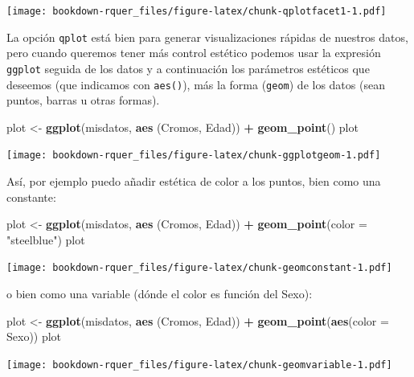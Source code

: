 \documentclass[]{book}
\newenvironment{Shaded}{\begin{snugshade}}{\end{snugshade}}
\newcommand{\DataTypeTok}[1]{\textcolor[rgb]{0.13,0.29,0.53}{#1}}
\newcommand{\KeywordTok}[1]{\textcolor[rgb]{0.13,0.29,0.53}{\textbf{#1}}}
\newcommand{\NormalTok}[1]{#1}
\newcommand{\OperatorTok}[1]{\textcolor[rgb]{0.81,0.36,0.00}{\textbf{#1}}}
\newcommand{\StringTok}[1]{\textcolor[rgb]{0.31,0.60,0.02}{#1}}
\theoremstyle{definition}
\theoremstyle{definition}
\theoremstyle{definition}
\theoremstyle{remark}
\begin{document}
\texttt{[image: bookdown-rquer\_files/figure-latex/chunk-qplotfacet1-1.pdf]}

La opción \texttt{qplot} está bien para generar visualizaciones rápidas
de nuestros datos, pero cuando queremos tener más control estético
podemos usar la expresión \texttt{ggplot} seguida de los datos y a
continuación los parámetros estéticos que deseemos (que indicamos con
\texttt{aes()}), más la forma (\texttt{geom}) de los datos (sean puntos,
barras u otras formas).

\begin{Shaded}
\begin{Highlighting}[]
\NormalTok{plot <-}\StringTok{ }\KeywordTok{ggplot}\NormalTok{(misdatos, }\KeywordTok{aes}\NormalTok{ (Cromos, Edad)) }\OperatorTok{+}\StringTok{ }\KeywordTok{geom_point}\NormalTok{()}
\NormalTok{plot}
\end{Highlighting}
\end{Shaded}

\texttt{[image: bookdown-rquer\_files/figure-latex/chunk-ggplotgeom-1.pdf]}

Así, por ejemplo puedo añadir estética de color a los puntos, bien como
una constante:

\begin{Shaded}
\begin{Highlighting}[]
\NormalTok{plot <-}\StringTok{ }\KeywordTok{ggplot}\NormalTok{(misdatos, }\KeywordTok{aes}\NormalTok{ (Cromos, Edad)) }\OperatorTok{+}\StringTok{ }\KeywordTok{geom_point}\NormalTok{(}\DataTypeTok{color =} \StringTok{"steelblue"}\NormalTok{)}
\NormalTok{plot}
\end{Highlighting}
\end{Shaded}

\texttt{[image: bookdown-rquer\_files/figure-latex/chunk-geomconstant-1.pdf]}

o bien como una variable (dónde el color es función del Sexo):

\begin{Shaded}
\begin{Highlighting}[]
\NormalTok{plot <-}\StringTok{ }\KeywordTok{ggplot}\NormalTok{(misdatos, }\KeywordTok{aes}\NormalTok{ (Cromos, Edad)) }\OperatorTok{+}\StringTok{ }\KeywordTok{geom_point}\NormalTok{(}\KeywordTok{aes}\NormalTok{(}\DataTypeTok{color =}\NormalTok{ Sexo))}
\NormalTok{plot}
\end{Highlighting}
\end{Shaded}

\texttt{[image: bookdown-rquer\_files/figure-latex/chunk-geomvariable-1.pdf]}
\end{document}
